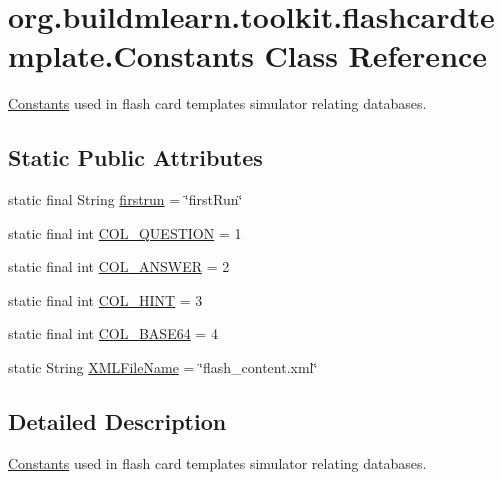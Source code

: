 \hypertarget{classorg_1_1buildmlearn_1_1toolkit_1_1flashcardtemplate_1_1Constants}{}\section{org.\+buildmlearn.\+toolkit.\+flashcardtemplate.\+Constants Class Reference}
\label{classorg_1_1buildmlearn_1_1toolkit_1_1flashcardtemplate_1_1Constants}


\hyperlink{classorg_1_1buildmlearn_1_1toolkit_1_1flashcardtemplate_1_1Constants}{Constants} used in flash card template\textquotesingle{}s simulator relating databases.  


\subsection*{Static Public Attributes}
\begin{DoxyCompactItemize}
\item 
static final String \hyperlink{classorg_1_1buildmlearn_1_1toolkit_1_1flashcardtemplate_1_1Constants_aee0ef58ce4cd2b4c2caf2468ea6441a4}{firstrun} = \char`\"{}first\+Run\char`\"{}
\item 
static final int \hyperlink{classorg_1_1buildmlearn_1_1toolkit_1_1flashcardtemplate_1_1Constants_a58f975870a5fc1b5b38324db18dce2f4}{C\+O\+L\+\_\+\+Q\+U\+E\+S\+T\+I\+ON} = 1
\item 
static final int \hyperlink{classorg_1_1buildmlearn_1_1toolkit_1_1flashcardtemplate_1_1Constants_a5eafcdb95ec9f114c351ae21b713c1be}{C\+O\+L\+\_\+\+A\+N\+S\+W\+ER} = 2
\item 
static final int \hyperlink{classorg_1_1buildmlearn_1_1toolkit_1_1flashcardtemplate_1_1Constants_a3a9c872bdd089b119da3037cedd05e6f}{C\+O\+L\+\_\+\+H\+I\+NT} = 3
\item 
static final int \hyperlink{classorg_1_1buildmlearn_1_1toolkit_1_1flashcardtemplate_1_1Constants_a0c370e604f3aeac82c60fc0d5f749207}{C\+O\+L\+\_\+\+B\+A\+S\+E64} = 4
\item 
static String \hyperlink{classorg_1_1buildmlearn_1_1toolkit_1_1flashcardtemplate_1_1Constants_a44b1cfc324107db29d9c469400c4619f}{X\+M\+L\+File\+Name} = \char`\"{}flash\+\_\+content.\+xml\char`\"{}
\end{DoxyCompactItemize}


\subsection{Detailed Description}
\hyperlink{classorg_1_1buildmlearn_1_1toolkit_1_1flashcardtemplate_1_1Constants}{Constants} used in flash card template\textquotesingle{}s simulator relating databases. 

